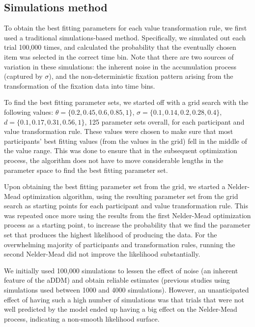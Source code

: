 \documentclass[11pt,a4paper]{article}
\begin{document}
\subsection{Simulations method}

To obtain the best fitting parameters for each value transformation rule, we first used a traditional simulations-based method. Specifically, we simulated out each trial 100,000 times, and calculated the probability that the eventually chosen item was selected in the correct time bin. Note that there are two sources of variation in these simulations: the inherent noise in the accumulation process (captured by $\sigma$), and the non-deterministic fixation pattern arising from the transformation of the fixation data into time bins.

To find the best fitting parameter sets, we started off with a grid search with the following values: $\theta=\{0.2, 0.45, 0.6, 0.85, 1\}$, $\sigma=\{0.1, 0.14, 0.2, 0.28, 0.4\}$, $\textit{d}=\{0.1, 0.17, 0.31, 0.56, 1\}$, 125 parameter sets overall, for each participant and value transformation rule. These values were chosen to make sure that most participants' best fitting values (from the values in the grid) fell in the middle of the value range. This was done to ensure that in the subsequent optimization process, the algorithm does not have to move considerable lengths in the parameter space to find the best fitting parameter set.

Upon obtaining the best fitting parameter set from the grid, we started a Nelder-Mead optimization algorithm, using the resulting parameter set from the grid search as starting points for each participant and value transformation rule. This was repeated once more using the results from the first Nelder-Mead optimization process as a starting point, to increase the probability that we find the parameter set that produces the highest likelihood of producing the data. For the overwhelming majority of participants and transformation rules, running the second Nelder-Mead did not improve the likelihood substantially.

We initially used 100,000 simulations to lessen the effect of noise (an inherent feature of the aDDM) and obtain reliable estimates (previous studies using simulations used between 1000 and 4000 simulations). However, an unanticipated effect of having such a high number of simulations was that trials that were not well predicted by the model ended up having a big effect on the Nelder-Mead process, indicating a non-smooth likelihood surface. 
\end{document}
